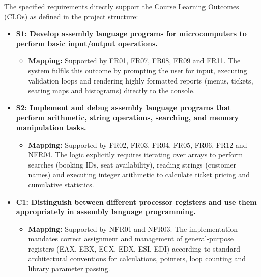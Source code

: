 \documentclass{thesis-library}
\begin{document}
The specified requirements directly support the Course Learning Outcomes (CLOs) as defined in the project structure:

\begin{itemize}
    \item \textbf{S1: Develop assembly language programs for microcomputers to perform basic input/output operations.}
    \begin{itemize}
        \item \textbf{Mapping:} Supported by FR01, FR07, FR08, FR09 and FR11. The system fulfils this outcome by prompting the user for input, executing validation loops and rendering highly formatted reports (menus, tickets, seating maps and histograms) directly to the console.
    \end{itemize}
    
    \item \textbf{S2: Implement and debug assembly language programs that perform arithmetic, string operations, searching, and memory manipulation tasks.}
    \begin{itemize}
        \item \textbf{Mapping:} Supported by FR02, FR03, FR04, FR05, FR06, FR12 and NFR04. The logic explicitly requires iterating over arrays to perform searches (booking IDs, seat availability), reading strings (customer names) and executing integer arithmetic to calculate ticket pricing and cumulative statistics.
    \end{itemize}

    \item \textbf{C1: Distinguish between different processor registers and use them appropriately in assembly language programming.}
    \begin{itemize}
        \item \textbf{Mapping:} Supported by NFR01 and NFR03. The implementation mandates correct assignment and management of general-purpose registers (EAX, EBX, ECX, EDX, ESI, EDI) according to standard architectural conventions for calculations, pointers, loop counting and library parameter passing.
    \end{itemize}
\end{itemize}
\end{document}
